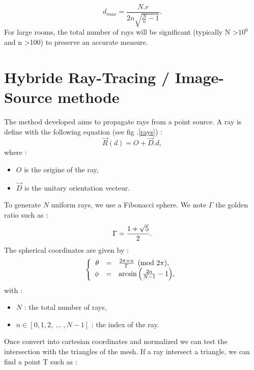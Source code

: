 \documentclass[AMA,STIX1COL]{WileyNJD-v2}
\begin{document}
\begin{equation}
	d_{max} =  \frac{N.r}{2n\sqrt{\frac{N}{n}-1}}.
\end{equation}
%
For large rooms, the total number of rays will be significant (typically N >$10^6$ and n >100) to preserve an accurate measure.







\section{Hybride Ray-Tracing / Image-Source methode}\label{sec3}

The method developed aims to propagate rays from a point source. A ray is define with the following equation (see fig .\ref{rays}) :
\begin{equation}
\overrightarrow{R}(d) = O + \overrightarrow{D}.d,
\end{equation}
where :
\begin{itemize}
\item $O$ is the origine of the ray,
\item $\overrightarrow{D}$ is the unitary orientation vecteur.
\end{itemize}

To generate $N$ uniform rays, we use a Fibonacci sphere. We note $\Gamma$ the golden ratio such as :
\begin{equation}
\Gamma = \frac{1 + \sqrt{5}}{2}. \\
\end{equation}
%
The spherical coordinates are given by :
\begin{equation}
  \left \{
   \begin{array}{r c l}
\theta &=& \frac{2 \pi \times n}{\Gamma}  \pmod{2\pi},  \\
\phi &=& \arcsin{\left(\frac{2n}{N-1}-1\right)}, 
   \end{array}
   \right .
\end{equation}
%
with : 
\begin{itemize}
\item $N$ : the total number of rays,
\item $n \in[0, 1, 2, \ ... \ ,N-1]$ : the index of the ray.
\end{itemize}
%
Once convert into cartesian coordinates and normalized we can test the intersection with the triangles of the mesh. If a ray intersect a triangle, we can find a point T such as :
\end{document}
